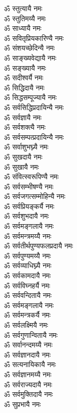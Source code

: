 \begin{flushleft}
\begin{multicols}{2}
ॐ स्तुत्यायै नमः\\
ॐ स्तुतिमय्यै नमः\hfill{}\\
ॐ साध्यायै नमः\\
ॐ सवितृप्रियकारिण्यै नमः\\
ॐ संशयच्छेदिन्यै नमः\\
ॐ साङ्ख्यवेद्यायै नमः\\
ॐ सङ्ख्यायै नमः\\
ॐ सदीश्वर्यै नमः\\
ॐ सिद्धिदायै नमः\\
ॐ सिद्धसम्पूज्यायै नमः\\
ॐ सर्वसिद्धिप्रदायिन्यै नमः\\
ॐ सर्वज्ञायै नमः\hfill{}\\
ॐ सर्वशक्त्यै नमः\\
ॐ सर्वसम्पत्प्रदायिन्यै नमः\\
ॐ सर्वाशुभघ्न्यै नमः\\
ॐ सुखदायै नमः\\
ॐ सुखायै नमः\\
ॐ संवित्स्वरूपिण्यै नमः\\
ॐ सर्वसम्भीषण्यै नमः\\
ॐ सर्वजगत्सम्मोहिन्यै नमः\\
ॐ सर्वप्रियङ्कर्यै नमः\\
ॐ सर्वशुभदायै नमः\hfill{}\\
ॐ सर्वमङ्गलायै नमः\\
ॐ सर्वमन्त्रमय्यै नमः\\
ॐ सर्वतीर्थपुण्यफलप्रदायै नमः\\
ॐ सर्वपुण्यमय्यै नमः\\
ॐ सर्वव्याधिघ्न्यै नमः\\
ॐ सर्वकामदायै नमः\\
ॐ सर्वविघ्नहर्यै नमः\\
ॐ सर्ववन्दितायै नमः\\
ॐ सर्वमङ्गलायै नमः\\
ॐ सर्वमन्त्रकर्यै नमः\hfill{}\\
ॐ सर्वलक्ष्मियै नमः\\
ॐ सर्वगुणान्वितायै नमः\\
ॐ सर्वानन्दमय्यै नमः\\
ॐ सर्वज्ञानदायै नमः\\
ॐ सत्यनायिकायै नमः\\
ॐ सर्वज्ञानमय्यै नमः\\
ॐ सर्वराज्यदायै नमः\\
ॐ सर्वमुक्तिदायै नमः\\
ॐ सुप्रभायै नमः\\

\end{multicols}
\end{flushleft}
